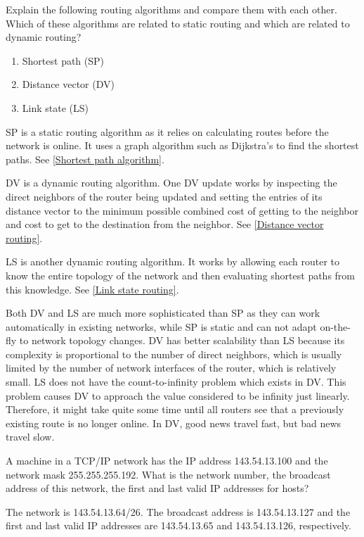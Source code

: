 \begin{Exercise}
Explain the following routing algorithms and compare them with each other.
Which of these algorithms are related to static routing and which are related to dynamic routing?

\begin{enumerate}
    \item Shortest path (SP)
    \item Distance vector (DV)
    \item Link state (LS)
\end{enumerate}
\end{Exercise}
\begin{Answer}
SP is a static routing algorithm as it relies on calculating routes before the network is online.
It uses a graph algorithm such as Dijkstra's to find the shortest paths. See \ref{Shortest path algorithm}.

DV is a dynamic routing algorithm. One DV update works by inspecting the direct neighbors of the router being updated and setting the entries of its distance vector to the minimum possible combined cost of getting to the neighbor and cost to get to the destination from the neighbor. See \ref{Distance vector routing}.

LS is another dynamic routing algorithm. It works by allowing each router to know the entire topology of the network and then evaluating shortest paths from this knowledge. See \ref{Link state routing}.

Both DV and LS are much more sophisticated than SP as they can work automatically in existing networks, while SP is static and can not adapt on-the-fly to network topology changes.
DV has better scalability than LS because its complexity is proportional to the number of direct neighbors, which is usually limited by the number of network interfaces of the router, which is relatively small.
LS does not have the count-to-infinity problem which exists in DV. This problem causes DV to approach the value considered to be infinity just linearly. Therefore, it might take quite some time until all routers see that a previously existing route is no longer online. In DV, good news travel fast, but bad news travel slow.
\end{Answer}

\begin{Exercise}
A machine in a TCP/IP network has the IP address 143.54.13.100 and the network mask 255.255.255.192. What is the network number, the broadcast address of this network, the first and last valid IP addresses for hosts?
\end{Exercise}
\begin{Answer}
The network is 143.54.13.64/26. The broadcast address is 143.54.13.127 and the first and last valid IP addresses are 143.54.13.65 and 143.54.13.126, respectively.
\end{Answer}

